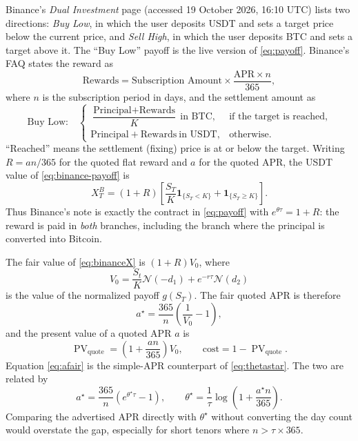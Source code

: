 \documentclass[11pt]{article}
\newcommand{\N}{\mathcal{N}}
\newcommand{\PV}{\operatorname{PV}}
\newcommand{\ind}[1]{\mathbf{1}_{\{#1\}}}
\begin{document}
Binance's \emph{Dual Investment} page (accessed 19 October 2026, 16:10 UTC) lists two directions: \emph{Buy Low}, in which the user deposits USDT and sets a target price below the current price, and \emph{Sell High}, in which the user deposits BTC and sets a target above it. The ``Buy Low'' payoff is the live version of \eqref{eq:payoff}. Binance's FAQ states the reward as
\begin{equation}\label{eq:binance-reward}
\text{Rewards}=\text{Subscription Amount}\times\frac{\text{APR}\times n}{365},
\end{equation}
where $n$ is the subscription period in days, and the settlement amount as
\begin{equation}\label{eq:binance-payoff}
\text{Buy Low:}\quad
\begin{cases}
\dfrac{\text{Principal}+\text{Rewards}}{K}\ \text{in BTC}, & \text{if the target is reached},\\[6pt]
\text{Principal}+\text{Rewards}\ \text{in USDT}, & \text{otherwise}.
\end{cases}
\end{equation}
``Reached'' means the settlement (fixing) price is at or below the target. Writing $R=a n/365$ for the quoted flat reward and $a$ for the quoted APR, the USDT value of \eqref{eq:binance-payoff} is
\begin{equation}\label{eq:binanceX}
X_T^{B}=(1+R)\left[\frac{S_T}{K}\ind{S_T<K}+\ind{S_T\ge K}\right].
\end{equation}
Thus Binance's note is exactly the contract in \eqref{eq:payoff} with $e^{\theta\tau}=1+R$: the reward is paid in \emph{both} branches, including the branch where the principal is converted into Bitcoin.

The fair value of \eqref{eq:binanceX} is $(1+R)V_0$, where
\begin{equation}\label{eq:V0}
V_0=\frac{S_t}{K}\N(-d_1)+e^{-r\tau}\N(d_2)
\end{equation}
is the value of the normalized payoff $g(S_T)$. The fair quoted APR is therefore
\begin{equation}\label{eq:afair}
a^\star=\frac{365}{n}\left(\frac{1}{V_0}-1\right),
\end{equation}
and the present value of a quoted APR $a$ is
\begin{equation}\label{eq:pvquote}
\PV_{\text{quote}}=\left(1+\frac{a n}{365}\right)V_0,
\qquad
\text{cost}=1-\PV_{\text{quote}}.
\end{equation}
Equation \eqref{eq:afair} is the simple-APR counterpart of \eqref{eq:thetastar}. The two are related by
\begin{equation}\label{eq:theta-a}
a^\star=\frac{365}{n}\left(e^{\theta^\star\tau}-1\right),
\qquad
\theta^\star=\frac{1}{\tau}\log\left(1+\frac{a^\star n}{365}\right).
\end{equation}
Comparing the advertised APR directly with $\theta^\star$ without converting the day count would overstate the gap, especially for short tenors where $n>\tau\times365$.
\end{document}

